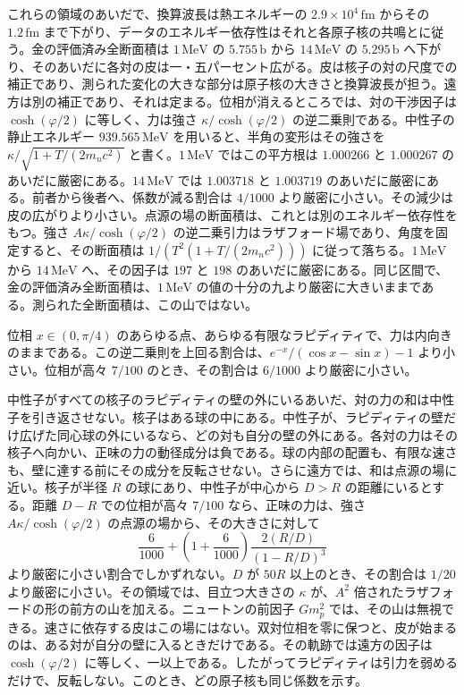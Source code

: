\documentclass[a4paper]{article}
\begin{document}
これらの領域のあいだで、換算波長は熱エネルギーの \(2.9\times 10^{4}\,\mathrm{fm}\) からその \(1.2\,\mathrm{fm}\) まで下がり、データのエネルギー依存性はそれと各原子核の共鳴とに従う。金の評価済み全断面積は \(1\,\mathrm{MeV}\) の \(5.755\,\mathrm{b}\) から \(14\,\mathrm{MeV}\) の \(5.295\,\mathrm{b}\) へ下がり、そのあいだに各対の皮は一・五パーセント広がる。皮は核子の対の尺度での補正であり、測られた変化の大きな部分は原子核の大きさと換算波長が担う。遠方は別の補正であり、それは定まる。位相が消えるところでは、対の干渉因子は \(\cosh(\varphi/2)\) に等しく、力は強さ \(\kappa/\cosh(\varphi/2)\) の逆二乗則である。中性子の静止エネルギー \(939.565\,\mathrm{MeV}\) を用いると、半角の変形はその強さを \(\kappa/\sqrt{1+T/(2m_n c^{2})}\) と書く。\(1\,\mathrm{MeV}\) ではこの平方根は \(1.000266\) と \(1.000267\) のあいだに厳密にある。\(14\,\mathrm{MeV}\) では \(1.003718\) と \(1.003719\) のあいだに厳密にある。前者から後者へ、係数が減る割合は \(4/1000\) より厳密に小さい。その減少は皮の広がりより小さい。点源の場の断面積は、これとは別のエネルギー依存性をもつ。強さ \(A\kappa/\cosh(\varphi/2)\) の逆二乗引力はラザフォード場であり、角度を固定すると、その断面積は \(1/(T^{2}(1+T/(2m_n c^{2})))\) に従って落ちる。\(1\,\mathrm{MeV}\) から \(14\,\mathrm{MeV}\) へ、その因子は \(197\) と \(198\) のあいだに厳密にある。同じ区間で、金の評価済み全断面積は、\(1\,\mathrm{MeV}\) の値の十分の九より厳密に大きいままである。測られた全断面積は、この山ではない。

位相 \(x\in(0,\pi/4)\) のあらゆる点、あらゆる有限なラピディティで、力は内向きのままである。この逆二乗則を上回る割合は、\(e^{-x}/(\cos x-\sin x)-1\) より小さい。位相が高々 \(7/100\) のとき、その割合は \(6/1000\) より厳密に小さい。

中性子がすべての核子のラピディティの壁の外にいるあいだ、対の力の和は中性子を引き返させない。核子はある球の中にある。中性子が、ラピディティの壁だけ広げた同心球の外にいるなら、どの対も自分の壁の外にある。各対の力はその核子へ向かい、正味の力の動径成分は負である。球の内部の配置も、有限な速さも、壁に達する前にその成分を反転させない。さらに遠方では、和は点源の場に近い。核子が半径 \(R\) の球にあり、中性子が中心から \(D>R\) の距離にいるとする。距離 \(D-R\) での位相が高々 \(7/100\) なら、正味の力は、強さ \(A\kappa/\cosh(\varphi/2)\) の点源の場から、その大きさに対して
\[
\frac{6}{1000}+\left(1+\frac{6}{1000}\right)\frac{2(R/D)}{(1-R/D)^{3}}
\]
より厳密に小さい割合でしかずれない。\(D\) が \(50R\) 以上のとき、その割合は \(1/20\) より厳密に小さい。その領域では、目立つ大きさの \(\kappa\) が、\(A^{2}\) 倍されたラザフォードの形の前方の山を加える。ニュートンの前因子 \(Gm_p^{2}\) では、その山は無視できる。速さに依存する皮はこの場にはない。双対位相を零に保つと、皮が始まるのは、ある対が自分の壁に入るときだけである。その軌跡では遠方の因子は \(\cosh(\varphi/2)\) に等しく、一以上である。したがってラピディティは引力を弱めるだけで、反転しない。このとき、どの原子核も同じ係数を示す。
\end{document}
